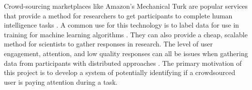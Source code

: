 \documentclass{article}
\begin{document}









Crowd-sourcing marketplaces like Amazon’s Mechanical Turk are popular services that provide a method for researchers to get participants to complete human intelligence tasks \cite{paolacci2010running}. 
A common use for this technology is to label data for use in training for machine learning algorithms \cite{chang2017revolt}.
They can also provide a cheap, scalable method for scientists to gather responses in research.
The level of user engagement, attention, and low quality responses can all be issues when gathering data from participants with distributed approaches \cite{ipeirotis2010quality}.
The primary motivation of this project is to develop a system of potentially identifying if a crowdsourced user is paying attention during a task.
\end{document}
